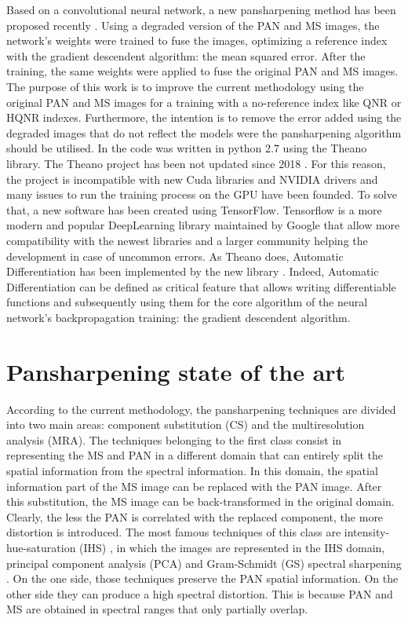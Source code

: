 \documentclass[12pt]{report}
\begin{document}
Based on a convolutional neural network, a new pansharpening method has been proposed recently \cite{pnn}.
Using a degraded version of the PAN and MS images, the network's weights were trained to fuse the images, optimizing a reference index with the gradient descendent algorithm: the mean squared error. After the training, the same weights were applied to fuse the original PAN and MS images.
The purpose of this work is to improve the current methodology using the original PAN and MS images for a training with a no-reference index like QNR or HQNR indexes. Furthermore, the intention is to remove the error added using the degraded images that do not reflect the models were the pansharpening algorithm should be utilised.
In \cite{pnn} the code was written in python 2.7 using the Theano library. The Theano project has been not updated since 2018 \cite{theanorip}. For this reason, the project is incompatible with new Cuda libraries and NVIDIA drivers and many issues to run the training process on the GPU have been founded. To solve that, a new software has been created using TensorFlow. Tensorflow is a more modern and popular DeepLearning library maintained by Google that allow more compatibility with the newest libraries and a larger community helping the development in case of uncommon errors. As Theano does, Automatic Differentiation has been implemented by the new library \cite{tensorflowautoderiv}. Indeed, Automatic Differentiation can be defined as critical feature that allows writing differentiable functions and subsequently using them for the core algorithm of the neural network's backpropagation training: the gradient descendent algorithm. 


\chapter{Pansharpening state of the art}


According to the current methodology, the pansharpening techniques are divided into two main areas: component substitution (CS) and the multiresolution analysis (MRA). The techniques belonging to the first class consist in representing the MS and PAN in a different domain that can entirely split the spatial information from the spectral information. In this domain, the spatial information part of the MS image can be replaced with the PAN image. After this substitution, the MS image can be back-transformed in the original domain. Clearly, the less the PAN is correlated with the replaced component, the more distortion is introduced. The most famous techniques of this class are intensity-hue-saturation (IHS) \cite{ihs1} \cite{ihs2}, in which the images are represented in the IHS domain, principal component analysis (PCA) \cite{scaleinvariance1} \cite{pca2} and Gram-Schmidt (GS) spectral sharpening \cite{gs}. On the one side, those techniques preserve the PAN spatial information. On the other side they can produce a high spectral distortion. This is because PAN and MS are obtained in spectral ranges that only partially overlap. 
\end{document}
